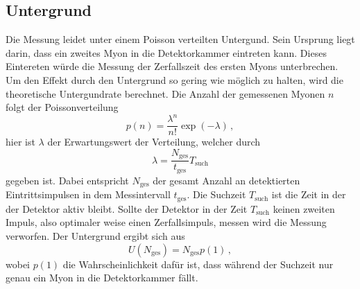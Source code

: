 \subsection{Untergrund}
Die Messung leidet unter einem Poisson verteilten Untergund.
Sein Ursprung liegt darin, dass ein zweites Myon in die Detektorkammer eintreten kann.
Dieses Eintereten würde die Messung der Zerfallszeit des ersten Myons unterbrechen.
Um den Effekt durch den Untergrund so gering wie möglich zu halten, wird die theoretische Untergundrate berechnet.
Die Anzahl der gemessenen Myonen $n$ folgt der Poissonverteilung
\begin{equation*}
    p(n) = \frac{\lambda^n}{n!} \exp(-\lambda)\, ,
\end{equation*}
hier ist $\lambda$ der Erwartungswert der Verteilung, welcher durch 
\begin{equation*}
    \lambda = \frac{N_\text{ges}}{t_\text{ges}} T_\text{such}
\end{equation*}
gegeben ist.
Dabei entspricht $N_\text{ges}$ der gesamt Anzahl an detektierten Eintrittsimpulsen in dem Messintervall $t_\text{ges}$.
Die Suchzeit $T_\text{such}$ ist die Zeit in der der Detektor aktiv bleibt.
Sollte der Detektor in der Zeit $T_\text{such}$ keinen zweiten Impuls, also optimaler weise einen Zerfallsimpuls, messen wird die Messung verworfen.
Der Untergrund ergibt sich aus 
\begin{equation}
    U(N_\text{ges}) = N_\text{ges} p(1)\, ,
    \label{eq:untergrund}
\end{equation}
wobei $p(1)$ die Wahrscheinlichkeit dafür ist, dass während der Suchzeit nur genau ein Myon in die Detektorkammer fällt.